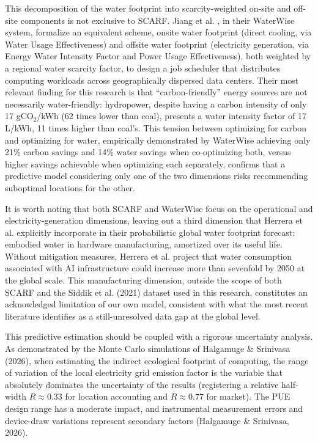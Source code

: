 \documentclass[conference]{IEEEtran}
\begin{document}
This decomposition of the water footprint into scarcity-weighted on-site and off-site components is not exclusive to SCARF. Jiang et al. \cite{Jiang2025WaterWise}, in their WaterWise system, formalize an equivalent scheme, onsite water footprint (direct cooling, via Water Usage Effectiveness) and offsite water footprint (electricity generation, via Energy Water Intensity Factor and Power Usage Effectiveness), both weighted by a regional water scarcity factor, to design a job scheduler that distributes computing workloads across geographically dispersed data centers. Their most relevant finding for this research is that ``carbon-friendly'' energy sources are not necessarily water-friendly: hydropower, despite having a carbon intensity of only 17 gCO$_2$/kWh (62 times lower than coal), presents a water intensity factor of 17 L/kWh, 11 times higher than coal's. This tension between optimizing for carbon and optimizing for water, empirically demonstrated by WaterWise achieving only 21\% carbon savings and 14\% water savings when co-optimizing both, versus higher savings achievable when optimizing each separately, confirms that a predictive model considering only one of the two dimensions risks recommending suboptimal locations for the other.

It is worth noting that both SCARF and WaterWise focus on the operational and electricity-generation dimensions, leaving out a third dimension that Herrera et al. \cite{Herrera2025} explicitly incorporate in their probabilistic global water footprint forecast: embodied water in hardware manufacturing, amortized over its useful life. Without mitigation measures, Herrera et al. project that water consumption associated with AI infrastructure could increase more than sevenfold by 2050 at the global scale. This manufacturing dimension, outside the scope of both SCARF and the Siddik et al. (2021) dataset used in this research, constitutes an acknowledged limitation of our own model, consistent with what the most recent literature identifies as a still-unresolved data gap at the global level.

This predictive estimation should be coupled with a rigorous uncertainty analysis. As demonstrated by the Monte Carlo simulations of Halgamuge \& Srinivasa (2026), when estimating the indirect ecological footprint of computing, the range of variation of the local electricity grid emission factor is the variable that absolutely dominates the uncertainty of the results (registering a relative half-width $R \approx 0.33$ for location accounting and $R \approx 0.77$ for market). The PUE design range has a moderate impact, and instrumental measurement errors and device-draw variations represent secondary factors (Halgamuge \& Srinivasa, 2026).
\end{document}
